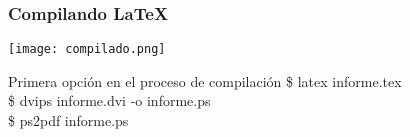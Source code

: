 \begin{frame}
   \frametitle{Compilando \LaTeX{}}
   \texttt{[image: compilado.png]}
   \vspace{0.9cm}\\
    \centering
    \begin{exampleblock}{Primera opci\'on en el proceso de compilaci\'on} %
        {\ttfamily \$ latex informe.tex\\ 
                          \$ dvips informe.dvi -o informe.ps \\
                          \$ ps2pdf informe.ps  }                               
    \end{exampleblock}                                  
\end{frame}

